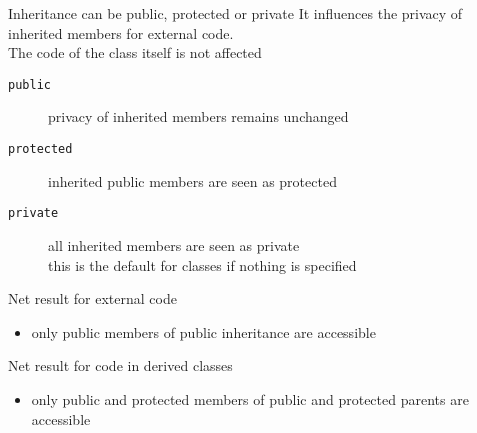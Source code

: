 \begin{frame}[fragile]
  \begin{block}{Inheritance can be public, protected or private}
    It influences the privacy of inherited members for external code.\\
    The code of the class itself is not affected
    \begin{description}
    \item[\texttt{public}] privacy of inherited members remains unchanged
    \item[\texttt{protected}] inherited public members are seen as protected
    \item[\texttt{private}] all inherited members are seen as private \\
      this is the default for classes if nothing is specified
    \end{description}
  \end{block}
  \pause
  \begin{block}{Net result for external code}
    \begin{itemize}
    \item only public members of public inheritance are accessible
    \end{itemize}
  \end{block}
  \begin{block}{Net result for code in derived classes}
    \begin{itemize}
    \item only public and protected members of public and protected parents are accessible
    \end{itemize}
  \end{block}
\end{frame}

